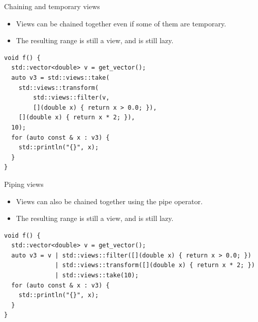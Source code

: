 \begin{frame}[t,fragile]{Chaining and temporary views}
\begin{itemize}
  \item Views can be chained together even if some of them are temporary.
  \item The resulting range is still a view, and is still lazy.
\end{itemize}

\begin{lstlisting}
void f() {
  std::vector<double> v = get_vector();
  auto v3 = std::views::take(
    std::views::transform(
        std::views::filter(v, 
        [](double x) { return x > 0.0; }), 
    [](double x) { return x * 2; }), 
  10);
  for (auto const & x : v3) {
    std::println("{}", x);
  }
}
\end{lstlisting}
\end{frame}

\begin{frame}[t,fragile]{Piping views}
\begin{itemize}
  \item Views can also be chained together using the pipe operator.
  \item The resulting range is still a view, and is still lazy.
\end{itemize}

\begin{lstlisting}
void f() {
  std::vector<double> v = get_vector();
  auto v3 = v | std::views::filter([](double x) { return x > 0.0; }) 
              | std::views::transform([](double x) { return x * 2; }) 
              | std::views::take(10);
  for (auto const & x : v3) {
    std::println("{}", x);
  }
}
\end{lstlisting}
\end{frame}